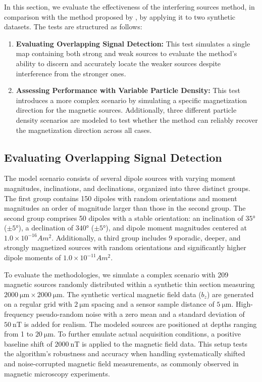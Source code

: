 In this section, we evaluate the effectiveness of the interfering sources method, in comparison with the method proposed by \citet{Souza-Junior2024}, by applying it to two synthetic datasets. The tests are structured as follows:  


\begin{enumerate}
    \item \textbf{Evaluating Overlapping Signal Detection:}
        This test simulates a single map containing both strong and weak sources to evaluate the method's ability to discern and accurately locate the weaker sources despite interference from the stronger ones.
    \item \textbf{Assessing Performance with Variable Particle Density:}
        This test introduces a more complex scenario by simulating a specific magnetization direction for the magnetic sources. Additionally, three different particle density scenarios are modeled to test whether the method can reliably recover the magnetization direction across all cases.
\end{enumerate}

\subsection{Evaluating Overlapping Signal Detection}

The model scenario consists of several dipole sources with varying moment magnitudes, inclinations, and declinations, organized into three distinct groups. The first group contains 150 dipoles with random orientations and moment magnitudes an order of magnitude larger than those in the second group. The second group comprises 50 dipoles with a stable orientation: an inclination of \(\ang{35}\) (\(\pm \ang{5}\)), a declination of \(\ang{340}\) (\(\pm \ang{5}\)), and dipole moment magnitudes centered at \(1.0 \times 10^{-16} Am^2\). Additionally, a third group includes 9 sporadic, deeper, and strongly magnetized sources with random orientations and significantly higher dipole moments of \(1.0 \times 10^{-11} Am^2\).

To evaluate the methodologies, we simulate a complex scenario with 209 magnetic sources randomly distributed within a synthetic thin section measuring \(\qty{2000}{\micro\meter} \times \qty{2000}{\micro\meter}\). The synthetic vertical magnetic field data (\(b_z\)) are generated on a regular grid with \(\qty{2}{\micro\meter}\) spacing and a sensor sample distance of \(\qty{5}{\micro\meter}\). High-frequency pseudo-random noise with a zero mean and a standard deviation of \(\qty{50}{\nano\tesla}\) is added for realism. The modeled sources are positioned at depths ranging from 1 to \(\qty{20}{\micro\meter}\). To further emulate actual acquisition conditions, a positive baseline shift of  \(\qty{2000}{\nano\tesla}\) is applied to the magnetic field data. This setup tests the algorithm's robustness and accuracy when handling systematically shifted and noise-corrupted magnetic field measurements, as commonly observed in magnetic microscopy experiments.


